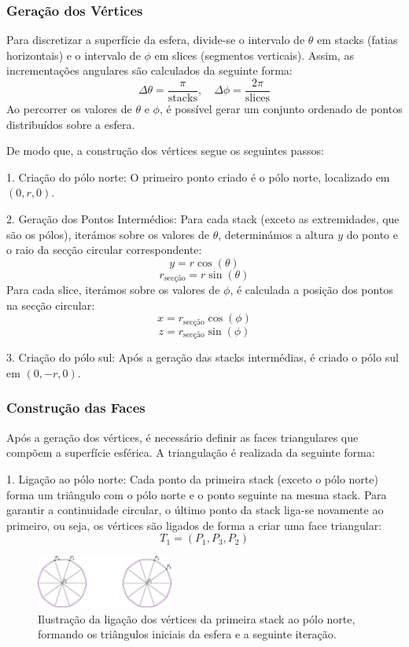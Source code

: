 \documentclass[12pt, a4paper]{article}
\begin{document}
\subsubsection{Geração dos Vértices}
Para discretizar a superfície da esfera, divide-se o intervalo de \( \theta \) em stacks
(fatias horizontais) e o intervalo de \( \phi \) em slices (segmentos verticais). Assim,
as incrementações angulares são calculados da seguinte forma:
\[
\Delta\theta = \frac{\pi}{\text{stacks}}, \quad \Delta\phi = \frac{2\pi}{\text{slices}}
\]
Ao percorrer os valores de \( \theta \) e \( \phi \), é possível gerar um conjunto ordenado
de pontos distribuídos sobre a esfera.

De modo que, a construção dos vértices segue os seguintes passos:

1. Criação do pólo norte: O primeiro ponto criado é o pólo norte, localizado em
\( (0, r, 0) \).

2. Geração dos Pontos Intermédios: Para cada stack (exceto as extremidades, que
são os pólos), iterámos sobre os valores de \( \theta \), determinámos a altura \( y \) do ponto
e o raio da secção circular correspondente:
\[
y = r \cos(\theta)
\]
\[
r_{\text{secção}} = r \sin(\theta)
\]
Para cada slice, iterámos sobre os valores de \( \phi \), é calculada a posição dos pontos
na secção circular:
\[
x = r_{\text{secção}} \cos(\phi)
\]
\[
z = r_{\text{secção}} \sin(\phi)
\]

3. Criação do pólo sul: Após a geração das stacks intermédias, é criado o pólo sul
em \( (0, -r, 0) \).

\subsubsection{Construção das Faces}
Após a geração dos vértices, é necessário definir as faces triangulares que compõem a superfície
esférica. A triangulação é realizada da seguinte forma:

1. Ligação ao pólo norte: Cada ponto da primeira stack (exceto o pólo norte) forma um
triângulo com o pólo norte e o ponto seguinte na mesma stack. Para garantir a continuidade circular,
o último ponto da stack liga-se novamente ao primeiro, ou seja, os vértices são ligados de forma a
criar uma face triangular:
\[
T_1 = (P_1, P_3, P_2)
\]

\begin{figure}[H]
    \centering
    \includegraphics[width=0.4\textwidth]{res/figures/polosSphere.pdf}
    \caption{
        Ilustração da ligação dos vértices da primeira stack ao pólo norte, formando os triângulos
        iniciais da esfera e a seguinte iteração.
    }
\end{figure}
\end{document}

